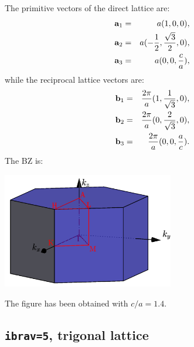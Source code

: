\documentclass[12pt,a4paper]{article}
\begin{document}
The primitive vectors of the direct lattice are:
\begin{eqnarray}
{\bf a}_1 &=& a (1, 0, 0), \nonumber \\
{\bf a}_2 &=& a (-{1 \over 2}, {\sqrt{3} \over 2}, 0), \nonumber \\
{\bf a}_3 &=& a (0, 0, {c\over a}), \nonumber
\nonumber
\end{eqnarray}
while the reciprocal lattice vectors are:
\begin{eqnarray}
{\bf b}_1 &=& {2\pi \over a} (1, {1 \over \sqrt{3}}, 0), \nonumber \\
{\bf b}_2 &=& {2\pi \over a} (0, {2 \over \sqrt{3}}, 0), \nonumber \\
{\bf b}_3 &=& {2\pi \over a} (0, 0, {a\over c}). \nonumber
\nonumber
\end{eqnarray}
The BZ is:
\begin{center}
\includegraphics[width=7.5cm,angle=0]{images/hex.png}
\end{center}
The figure has been obtained with ${c/a}=1.4$.

\subsection{\texttt{ibrav=5}, trigonal lattice}
\end{document}
